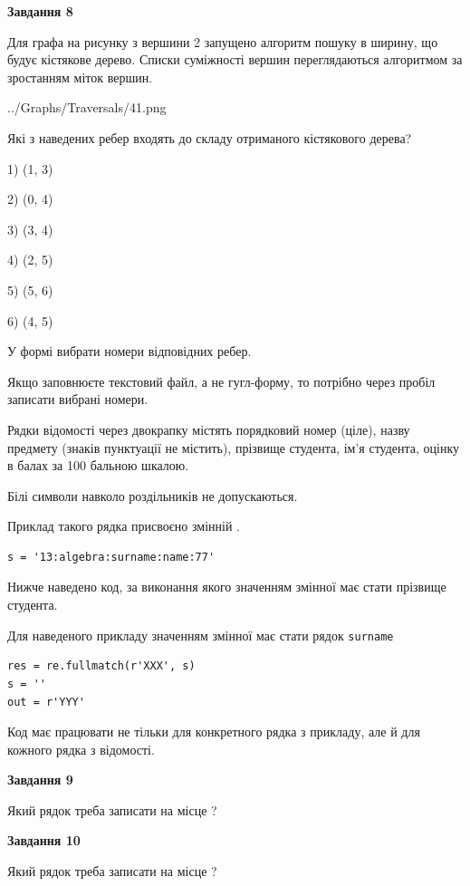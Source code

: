 \documentclass[12pt, ukrainian]{article}
\def\code#1{\Verb!#1!}
\begin{document}
{\begin {large}
{\begin {center}\textbf{Завдання 8}\end {center}}\par
Для графа на рисунку з вершини 2 запущено алгоритм пошуку в ширину, що будує кістякове дерево. Списки суміжності вершин переглядаються алгоритмом за зростанням міток вершин.\par
\begin{center}
	{../Graphs/Traversals/41.png}
\end{center}
\par Які з наведених ребер входять до складу отриманого кістякового дерева?\par
1) (1, 3)\par
2) (0, 4)\par
3) (3, 4)\par
4) (2, 5)\par
5) (5, 6)\par
6) (4, 5)\par
{\vskip 15pt} У формі вибрати номери відповідних ребер.


Якщо заповнюєте текстовий файл, а не гугл-форму, то потрібно через пробіл записа\-ти вибрані номери.\par
\newpage


Рядки відомості через двокрапку містять порядковий номер (ціле), назву предмету (знаків пунктуації не містить), прізвище студента, ім'я студента, оцінку в балах за 100 бальною шкалою.

Білі символи навколо роздільників не допускаються.

Приклад такого рядка присвоєно змінній .



\begin{verbatim}
s = '13:algebra:surname:name:77'
\end{verbatim}


Нижче наведено код, за виконання якого значенням змінної  має стати прізвище студента.

Для наведеного прикладу значенням змінної  має стати рядок \code{surname}



\begin{verbatim}
res = re.fullmatch(r'XXX', s)
s = ''
out = r'YYY'
\end{verbatim}


Код має працювати не тільки для конкретного рядка з прикладу, але й для кожного рядка з відомості.

{\begin {center}\textbf{Завдання 9}\end {center}}\par
Який рядок треба записати на місце  ?\par
\vspace{5mm}


{\begin {center}\textbf{Завдання 10}\end {center}}\par
Який рядок треба записати на місце  ?\par


\newpage


\end {large}}
\end{document}
